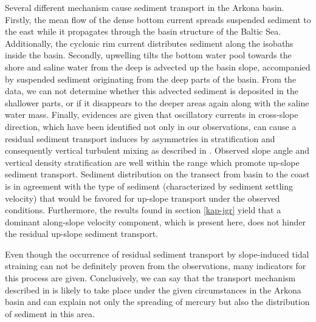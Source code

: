 Several different mechanism cause sediment transport in the Arkona basin. 
Firstly, the mean flow of 
the dense bottom current spreads suspended sediment to the east while it 
propagates through the basin structure of the Baltic Sea. Additionally, the 
cyclonic rim current distributes sediment along the isobaths inside the basin. 
Secondly, upwelling tilts the bottom water pool towards the shore and saline 
water from the deep is advected up the basin slope, accompanied by 
suspended sediment originating from the deep parts of the basin. From the data, 
we can not determine whether this advected sediment is deposited in the 
shallower parts, or if it disappears to the deeper areas again along with the 
saline water mass. Finally, evidences are given that oscillatory currents 
in cross-slope direction, which have been identified not only in our 
observations, can cause a residual sediment transport induces by asymmetries in 
stratification and consequently vertical turbulent mixing as described in 
\cite{schulzumlauf2016}. Observed slope angle and vertical density 
stratification are well within the range which promote up-slope sediment 
transport. Sediment distribution on the transect from basin to the coast is in 
agreement with the type of sediment (characterized by sediment settling 
velocity) that would be favored for up-slope transport under the observed 
conditions. Furthermore, the results found in section \ref{kap-jgr} yield that 
a dominant along-slope velocity component, which is present here, does not 
hinder the residual up-slope sediment transport.

Even though the occurrence of residual sediment transport by slope-induced tidal 
straining can not be definitely proven from the observations, many indicators 
for this process are given. Conclusively, we can say that the transport 
mechanism described in \cite{schulzumlauf2016} is likely to take place under 
the given circumstances in the Arkona basin and can explain not only the 
spreading of mercury but also the distribution of sediment in this area.